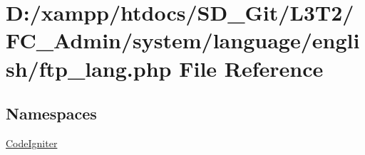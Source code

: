\hypertarget{ftp__lang_8php}{}\section{D\+:/xampp/htdocs/\+S\+D\+\_\+\+Git/\+L3\+T2/\+F\+C\+\_\+\+Admin/system/language/english/ftp\+\_\+lang.php File Reference}
\label{ftp__lang_8php}
\subsection*{Namespaces}
\begin{DoxyCompactItemize}
\item 
 \hyperlink{namespace_code_igniter}{Code\+Igniter}
\end{DoxyCompactItemize}
